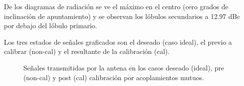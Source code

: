 De los diagramas de radiación se ve el máximo en el centro (cero grados de inclinación de apuntamiento) y se observan los
lóbulos secundarios a 12.97 dBc por debajo del lóbulo primario.

Los tres estados de señales graficados son el deseado (caso ideal), el previo a calibrar (non-cal) y el resultante de la
calibración (cal).

\begin{figure}[H]
	\centering

	\caption{Señales transmitidas por la antena en los casos deseado (ideal), pre (non-cal) y post (cal) calibración por acoplamientos mutuos.}
	\label{fig:nonErrMutual0deg}
\end{figure}

